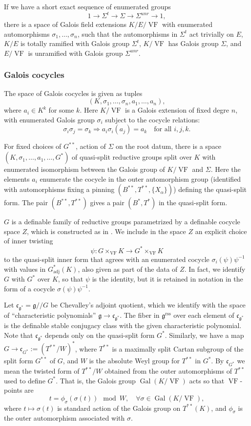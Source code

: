 \documentclass[12pt]{amsart}
\newcommand{\op}[1]{\operatorname{#1}}
\def\VF{{\op{VF}}}
\newcommand{\fg}{\mathfrak{g}}
\newcommand{\fc}{\mathfrak{c}}
\newcommand{\reg}{\mathrm{rss}}
\theoremstyle{plain}
\theoremstyle{definition}
\begin{document}
If we have a short exact sequence of enumerated groups 
\[
1 \to \Sigma^t \to \Sigma \to \Sigma^{unr}\to 1,
\]
there is a space of Galois field extensions $K/E/\VF$ with enumerated
automorphisms $\sigma_1,\ldots,\sigma_n$, such that the automorphisms in
$\Sigma^t$ act trivially on $E$, $K/E$ is totally ramified with Galois
group $\Sigma^t$, $K/\VF$ has Galois group $\Sigma$, and $E/\VF$ is
unramified with Galois group $\Sigma^{unr}$.

\subsubsection{Galois cocycles}

The space of Galois cocycles is given as tuples
\[
(K,\sigma_1,\ldots,\sigma_n,a_1,\ldots,a_n),
\]
where $a_i \in K^k$ for some $k$.  Here $K/\VF$ is a Galois extension of
fixed degre $n$, with enumerated Galois group $\sigma_i$ subject to
the cocycle relations:
\[
\sigma_i \sigma_j 
  = \sigma_k \Longrightarrow a_i \sigma_i(a_j) 
  = a_k\quad\text{for all } i,j,k.
\]

For fixed choices of $G^{**}$, action of $\Sigma$ on the root datum,
there is a space $(K,\sigma_1,\ldots,a_1,\ldots,G^*)$ of
quasi-split reductive groups split over $K$ with enumerated
isomorphism between the Galois group of $K/\VF$ and $\Sigma$.  Here
the elements $a_i$ enumerate the cocycle in the outer
automorphism group (identified with automorphisms fixing a pinning
$(B^{**},T^{**},\{X_\alpha\})$) defining the quasi-split form.  The
pair $(B^{**},T^{**})$ gives a pair $(B^*,T^*)$ in the quasi-split
form.

$G$ is a definable family of reductive groups parametrized by a
definable cocycle space $Z$, which is constructed as in \cite{CGH}.
We include in the space $Z$ an explicit choice of inner twisting
\[
\psi:G
\times_\VF K \to G^*\times_\VF K
\] to the quasi-split inner form that agrees with an enumerated
cocycle $\sigma_i(\psi) \psi^{-1}$ with values in $G^*_{\text{adj}}(K)$, also
given as part of the data of $Z$.  In fact, we identify $G$ with $G^*$
over $K$, so that $\psi$ is the identity, but it is retained in
notation in the form of a cocycle $\sigma(\psi)\psi^{-1}$.  

Let $\fc_{\fg^{*}} = \fg/\!/G$ be Chevalley's adjoint quotient, which
we identify with the space of ``characteristic polynomials'' $\fg\to
\fc_{\fg^{*}}$.  The fiber in $\fg^\reg$ over each element of
$\fc_{\fg^{*}}$ is the definable stable conjugacy class with the given
characteristic polynomial.  Note that $\fc_{\fg^{*}}$ depends only on
the quasi-split form $G^*$. Similarly, we have a map $G\to \fc_{G^*}:=
(T^{**}/W)^*$, where $T^{**}$ is a maximally split Cartan subgroup of
the split form $G^{**}$ of $G$, and $W$ is the absolute Weyl group for
$T^{**}$ in $G^*$.  By $\fc_{G^*}$ we mean the twisted form of
$T^{**}/W$ obtained from the outer automorphisms of $T^{**}$ used to
define $G^*$.  That is, the Galois group $\op{Gal}(K/\VF)$ acts so
that $\VF$-points are
\[
t =  \phi_\sigma(\sigma(t))\mod W, \quad\forall \sigma\in\op{Gal}(K/\VF),
\]
where $t\mapsto \sigma(t)$ is standard action of the Galois
group on $T^{**}(K)$, and $\phi_\sigma$ is the outer automorphism
associated with $\sigma$.
\end{document}

